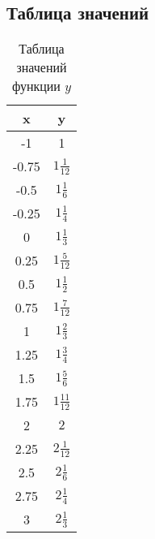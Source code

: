 \documentclass[a4paper, 12pt, oneside]{article}
\newcommand\labeltable[3] {
    \captionsetup{format=tablecaption}
    \begin{table}[H]
        \caption{#2}
        \begin{center}
            #1
        \end{center}
        \label{#3}
    \end{table}
}
\begin{document}
    \subsection{Таблица значений}
    \labeltable{
        \begin{tabular}{|c|c|}
            \hline
            x     & y                \\
            \hline
            -1    & 1                \\
            \hline
            -0.75 & $1\frac{1}{12}$  \\
            \hline
            -0.5  & $1\frac{1}{6}$   \\
            \hline
            -0.25 & $1\frac{1}{4}$   \\
            \hline
            0     & $1\frac{1}{3}$   \\
            \hline
            0.25  & $1\frac{5}{12}$  \\
            \hline
            0.5   & $1\frac{1}{2}$   \\
            \hline
            0.75  & $1\frac{7}{12}$  \\
            \hline
            1     & $1\frac{2}{3}$   \\
            \hline
            1.25  & $1\frac{3}{4}$   \\
            \hline
            1.5   & $1\frac{5}{6}$   \\
            \hline
            1.75  & $1\frac{11}{12}$ \\
            \hline
            2     & $2$              \\
            \hline
            2.25  & $2\frac{1}{12}$  \\
            \hline
            2.5   & $2\frac{1}{6}$   \\
            \hline
            2.75  & $2\frac{1}{4}$   \\
            \hline
            3     & $2\frac{1}{3}$   \\
            \hline
        \end{tabular}
    }{Таблица значений функции $y$}{tab:task11-values-table}
\end{document}
